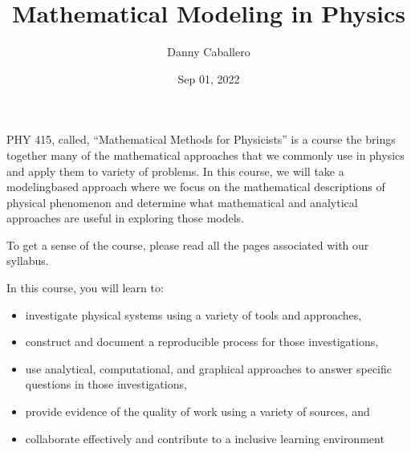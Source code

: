 \documentclass[letterpaper,10pt,english]{jupyterBook}
\title{Mathematical Modeling in Physics}
\date{Sep 01, 2022}
\author{Danny Caballero}
\begin{document}
\pagestyle{empty}
\sphinxmaketitle
\pagestyle{plain}
\sphinxtableofcontents
\pagestyle{normal}
\label{\detokenize{content/intro::doc}}


\sphinxAtStartPar
PHY 415, called, “Mathematical Methods for Physicists” is a course the brings together many of the mathematical approaches that we commonly use in physics and apply them to variety of problems. In this course, we will take a modeling\sphinxhyphen{}based approach where we focus on the mathematical descriptions of physical phenomenon and determine what mathematical and analytical approaches are useful in exploring those models.

\sphinxAtStartPar
To get a sense of the course, please read all the pages associated with our syllabus.

\begin{DUlineblock}{0em}
\item[] 
\end{DUlineblock}

\sphinxAtStartPar
In this course, you will learn to:
\begin{itemize}
\item {} 
\sphinxAtStartPar
investigate physical systems using a variety of tools and approaches,

\item {} 
\sphinxAtStartPar
construct and document a reproducible process for those investigations,

\item {} 
\sphinxAtStartPar
use analytical, computational, and graphical approaches to answer specific questions in those investigations,

\item {} 
\sphinxAtStartPar
provide evidence of the quality of work using a variety of sources, and

\item {} 
\sphinxAtStartPar
collaborate effectively and contribute to a inclusive learning environment

\end{itemize}

\begin{DUlineblock}{0em}
\item[] 
\end{DUlineblock}
\end{document}
